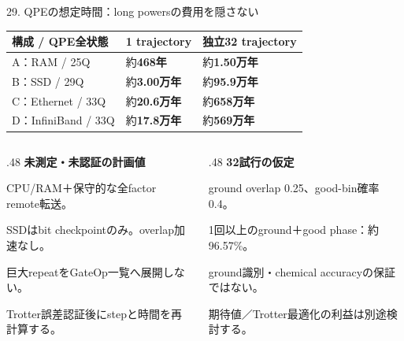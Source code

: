 \begin{frame}{29. QPEの想定時間：long powersの費用を隠さない}
  \small
  \begin{tabularx}{\textwidth}{@{}p{}XX@{}}
    \toprule 構成 / QPE全状態 & 1 trajectory & 独立32 trajectory \\
    \midrule
    A：RAM / 25Q & 約\textbf{468年} & 約\textbf{1.50万年} \\
    B：SSD / 29Q & 約\textbf{3.00万年} & 約\textbf{95.9万年} \\
    C：Ethernet / 33Q & 約\textbf{20.6万年} & 約\textbf{658万年} \\
    D：InfiniBand / 33Q & 約\textbf{17.8万年} & 約\textbf{569万年} \\
    \bottomrule
  \end{tabularx}
  \medskip
  \begin{columns}[T,onlytextwidth]
    \begin{column}{.48\textwidth}
      \textbf{未測定・未認証の計画値}\par
      \small CPU/RAM＋保守的な全factor remote転送。\par
      SSDはbit checkpointのみ。overlap加速なし。\par
      巨大repeatをGateOp一覧へ展開しない。\par
      Trotter誤差認証後にstepと時間を再計算する。
    \end{column}
    \begin{column}{.48\textwidth}
      \textbf{32試行の仮定}\par
      \small ground overlap 0.25、good-bin確率0.4。\par
      1回以上のground＋good phase：約96.57\%。\par
      ground識別・chemical accuracyの保証ではない。\par
      期待値／Trotter最適化の利益は別途検討する。
    \end{column}
  \end{columns}
\end{frame}


